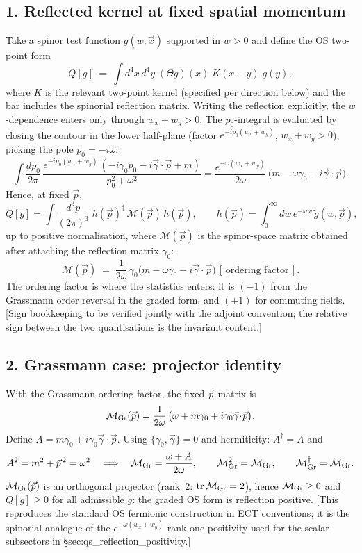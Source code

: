 \subsection*{1. Reflected kernel at fixed spatial momentum}
Take a spinor test function $g(w,\vec x)$ supported in $w>0$ and
define the OS two-point form
\[
Q[g]\;=\;\int d^4x\,d^4y\;
\overline{(\Theta g)(x)}\;K(x-y)\;g(y),
\]
where $K$ is the relevant two-point kernel (specified per
direction below) and the bar includes the spinorial reflection
matrix.
Writing the reflection explicitly, the $w$-dependence enters only
through $w_x+w_y>0$.
The $p_0$-integral is evaluated by closing the contour in the lower
half-plane (factor $e^{-ip_0(w_x+w_y)}$, $w_x+w_y>0$), picking the
pole $p_0=-i\omega$:
\[
\int\!\frac{dp_0}{2\pi}\,
\frac{e^{-ip_0(w_x+w_y)}\,(-i\gamma_0 p_0-i\vec\gamma\!\cdot\!\vec p+m)}
{p_0^2+\omega^2}
=\frac{e^{-\omega(w_x+w_y)}}{2\omega}\,
\bigl(m-\omega\gamma_0-i\vec\gamma\!\cdot\!\vec p\bigr).
\]
Hence, at fixed $\vec p$,
\[
Q[g]=\int\!\frac{d^3p}{(2\pi)^3}\;
h(\vec p)^{\dagger}\,\mathcal M(\vec p)\,h(\vec p),
\qquad
h(\vec p)=\int_0^{\infty}\!dw\,e^{-\omega w}\,
\tilde g(w,\vec p),
\]
up to positive normalisation, where $\mathcal M(\vec p)$ is the
spinor-space matrix obtained after attaching the reflection matrix
$\gamma_0$:
\[
\mathcal M(\vec p)\;=\;
\frac{1}{2\omega}\,\gamma_0
\bigl(m-\omega\gamma_0-i\vec\gamma\!\cdot\!\vec p\bigr)\,
[\,\text{ordering factor}\,].
\]
The ordering factor is where the statistics enters: it is $(-1)$
from the Grassmann order reversal in the graded form, and $(+1)$
for commuting fields.
[Sign bookkeeping to be verified jointly with the adjoint
convention; the relative sign between the two quantisations is the
invariant content.]

\subsection*{2. Grassmann case: projector identity}
With the Grassmann ordering factor, the fixed-$\vec p$ matrix is
\[
\mathcal M_{\rm Gr}(\vec p)
=\frac{1}{2\omega}\,
\bigl(\omega+ m\gamma_0+i\gamma_0\vec\gamma\!\cdot\!\vec p\bigr).
\]
Define $A=m\gamma_0+i\gamma_0\vec\gamma\!\cdot\!\vec p$.
Using $\{\gamma_0,\vec\gamma\}=0$ and hermiticity:
$A^{\dagger}=A$ and
\[
A^2=m^2+\vec p^{\,2}=\omega^2
\quad\Longrightarrow\quad
\mathcal M_{\rm Gr}=\frac{\omega+A}{2\omega},
\qquad
\mathcal M_{\rm Gr}^2=\mathcal M_{\rm Gr},
\qquad
\mathcal M_{\rm Gr}^{\dagger}=\mathcal M_{\rm Gr}.
\]
$\mathcal M_{\rm Gr}(\vec p)$ is an orthogonal projector (rank~2:
$\mathrm{tr}\,\mathcal M_{\rm Gr}=2$), hence
$\mathcal M_{\rm Gr}\ge 0$ and $Q[g]\ge 0$ for all admissible $g$:
the graded OS form is reflection positive.
[This reproduces the standard OS fermionic construction in ECT
conventions; it is the spinorial analogue of the
$e^{-\omega(w_x+w_y)}$ rank-one positivity used for the scalar
subsectors in \S sec:qs\_reflection\_positivity.]

